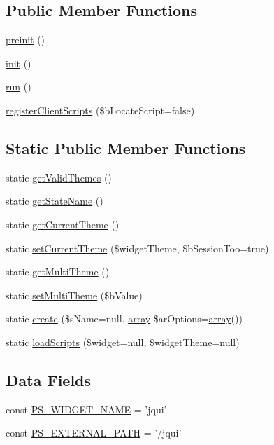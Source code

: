 \subsection*{Public Member Functions}
\begin{DoxyCompactItemize}
\item 
\hyperlink{classCPSjqUIWrapper_a2dc262e99b1c246b56f27626bfe699ff}{preinit} ()
\item 
\hyperlink{classCPSjqUIWrapper_a4be4055f3361d4800e16bc2e2e38cda6}{init} ()
\item 
\hyperlink{classCPSjqUIWrapper_afb0fafe7e02a3ae1993c01c19fad2bae}{run} ()
\item 
\hyperlink{classCPSjqUIWrapper_ac02a66bde8e72e4909137bf748edf665}{registerClientScripts} (\$bLocateScript=false)
\end{DoxyCompactItemize}
\subsection*{Static Public Member Functions}
\begin{DoxyCompactItemize}
\item 
static \hyperlink{classCPSjqUIWrapper_aad3fae32ed41de6a64288d3c0a01b56d}{getValidThemes} ()
\item 
static \hyperlink{classCPSjqUIWrapper_a43924bdf5b5f04904b65e9852f4b35ed}{getStateName} ()
\item 
static \hyperlink{classCPSjqUIWrapper_a1fba0833b16e3ca8470ef13b70f66a40}{getCurrentTheme} ()
\item 
static \hyperlink{classCPSjqUIWrapper_a644a97c97c7461c0f04560a610584dbd}{setCurrentTheme} (\$widgetTheme, \$bSessionToo=true)
\item 
static \hyperlink{classCPSjqUIWrapper_a60cfa3447f5be59345c3b145afe7b90d}{getMultiTheme} ()
\item 
static \hyperlink{classCPSjqUIWrapper_a4ab913b8ede018fb56d43c228696f957}{setMultiTheme} (\$bValue)
\item 
static \hyperlink{classCPSjqUIWrapper_a0ffc269a208148ade57c7eb608a4562a}{create} (\$sName=null, \hyperlink{list_8php_aa3205d038c7f8feb5c9f01ac4dfadc88}{array} \$arOptions=\hyperlink{list_8php_aa3205d038c7f8feb5c9f01ac4dfadc88}{array}())
\item 
static \hyperlink{classCPSjqUIWrapper_ac23dbff4185dd0a77d381116a054bb50}{loadScripts} (\$widget=null, \$widgetTheme=null)
\end{DoxyCompactItemize}
\subsection*{Data Fields}
\begin{DoxyCompactItemize}
\item 
const \hyperlink{classCPSjqUIWrapper_ae357f9dc377f7de0d12010b2ced28cbc}{PS\_\-WIDGET\_\-NAME} = 'jqui'
\item 
const \hyperlink{classCPSjqUIWrapper_a8ccb5e1d65c091f944a6aa8c5be834ca}{PS\_\-EXTERNAL\_\-PATH} = '/jqui'
\end{DoxyCompactItemize}
